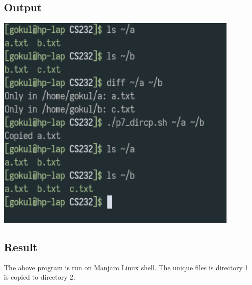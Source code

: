 \documentclass{article}
\begin{document}
\subsection{Output}
\includegraphics[width=0.9\textwidth]{img/p11.png}\newline

\subsection{Result}
The above program is run on Manjaro Linux shell. The unique files is directory 1
is copied to directory 2.
\end{document}
